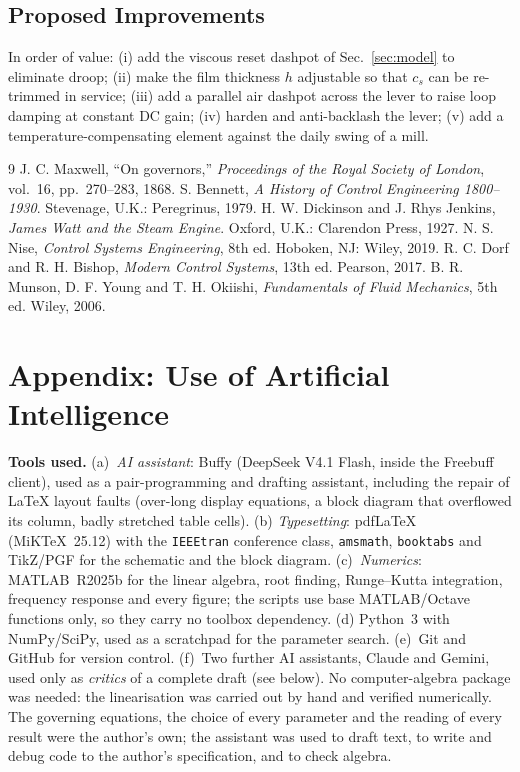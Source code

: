 \documentclass[conference]{IEEEtran}
\begin{document}
\subsection{Proposed Improvements}
In order of value: (i) add the viscous reset dashpot of Sec.~\ref{sec:model} to
eliminate droop; (ii) make the film thickness $h$ adjustable so that $c_s$ can be
re-trimmed in service; (iii) add a parallel air dashpot across the lever to raise
loop damping at constant DC gain; (iv) harden and anti-backlash the lever; (v) add a
temperature-compensating element against the daily swing of a mill.

\begin{thebibliography}{9}
 J. C. Maxwell, ``On governors,'' \emph{Proceedings of the Royal
Society of London}, vol.~16, pp.~270--283, 1868.
 S. Bennett, \emph{A History of Control Engineering 1800--1930}.
Stevenage, U.K.: Peregrinus, 1979.
 H. W. Dickinson and J. Rhys Jenkins, \emph{James Watt and the
Steam Engine}. Oxford, U.K.: Clarendon Press, 1927.
 N. S. Nise, \emph{Control Systems Engineering}, 8th ed. Hoboken, NJ:
Wiley, 2019.
 R. C. Dorf and R. H. Bishop, \emph{Modern Control Systems}, 13th ed.
Pearson, 2017.
 B. R. Munson, D. F. Young and T. H. Okiishi, \emph{Fundamentals of
Fluid Mechanics}, 5th ed. Wiley, 2006.
\end{thebibliography}

\clearpage
\section*{Appendix: Use of Artificial Intelligence}

\textbf{Tools used.} (a)~\emph{AI assistant}: Buffy (DeepSeek V4.1 Flash, inside
the Freebuff client), used as a pair-programming and drafting assistant, including
the repair of LaTeX layout faults (over-long display equations, a block diagram
that overflowed its column, badly stretched table cells). (b)
\emph{Typesetting}: pdfLaTeX (MiKTeX~25.12) with the \texttt{IEEEtran} conference
class, \texttt{amsmath}, \texttt{booktabs} and TikZ/PGF for the schematic and the
block diagram. (c)~\emph{Numerics}: MATLAB~R2025b for the linear algebra, root
finding, Runge--Kutta integration, frequency response and every figure; the scripts
use base MATLAB/Octave functions only, so they carry no toolbox dependency. (d)
Python~3 with NumPy/SciPy, used as a scratchpad for the parameter search. (e)~Git
and GitHub for version control. (f)~Two further AI assistants, Claude and Gemini,
used only as \emph{critics} of a complete draft (see below). No
computer-algebra package was needed: the linearisation was carried out by hand and
verified numerically. The governing equations, the choice of every parameter and
the reading of every result were the author's own; the assistant was used to draft
text, to write and debug code to the author's specification, and to check algebra.
\end{document}
